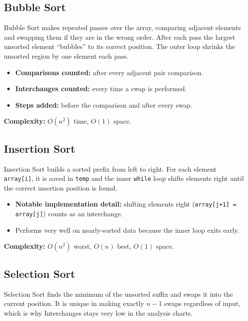 \documentclass[12pt,a4paper]{article}
\begin{document}
\subsection{Bubble Sort}

Bubble Sort makes repeated passes over the array, comparing adjacent elements
and swapping them if they are in the wrong order. After each pass the largest
unsorted element ``bubbles'' to its correct position. The outer loop shrinks
the unsorted region by one element each pass.

\begin{itemize}[nosep]
    \item \textbf{Comparisons counted:} after every adjacent pair comparison.
    \item \textbf{Interchanges counted:} every time a swap is performed.
    \item \textbf{Steps added:} before the comparison and after every swap.
\end{itemize}

\textbf{Complexity:} $O(n^2)$ time, $O(1)$ space.

\subsection{Insertion Sort}

Insertion Sort builds a sorted prefix from left to right. For each element
\texttt{array[i]}, it is saved in \texttt{temp} and the inner \texttt{while}
loop shifts elements right until the correct insertion position is found.

\begin{itemize}[nosep]
    \item \textbf{Notable implementation detail:} shifting elements right
          (\texttt{array[j+1] = array[j]}) counts as an interchange.
    \item Performs very well on nearly-sorted data because the inner loop
          exits early.
\end{itemize}

\textbf{Complexity:} $O(n^2)$ worst, $O(n)$ best, $O(1)$ space.

\subsection{Selection Sort}

Selection Sort finds the minimum of the unsorted suffix and swaps it into the
current position. It is unique in making exactly $n-1$ swaps regardless of
input, which is why Interchanges stays very low in the analysis charts.
\end{document}
